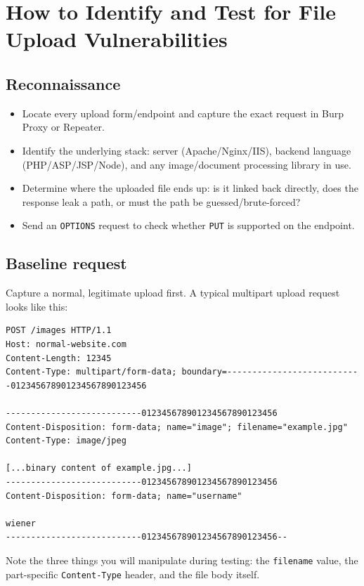 \documentclass[11pt]{article}
\begin{document}
\section{How to Identify and Test for File Upload Vulnerabilities}

\subsection{Reconnaissance}
\begin{itemize}[leftmargin=1.4em]
    \item Locate every upload form/endpoint and capture the exact request in Burp Proxy or Repeater.
    \item Identify the underlying stack: server (Apache/Nginx/IIS), backend language (PHP/ASP/JSP/Node), and any image/document processing library in use.
    \item Determine where the uploaded file ends up: is it linked back directly, does the response leak a path, or must the path be guessed/brute-forced?
    \item Send an \texttt{OPTIONS} request to check whether \texttt{PUT} is supported on the endpoint.
\end{itemize}

\subsection{Baseline request}
Capture a normal, legitimate upload first. A typical multipart upload request looks like this:

\begin{lstlisting}[language=http]
POST /images HTTP/1.1
Host: normal-website.com
Content-Length: 12345
Content-Type: multipart/form-data; boundary=---------------------------012345678901234567890123456

---------------------------012345678901234567890123456
Content-Disposition: form-data; name="image"; filename="example.jpg"
Content-Type: image/jpeg

[...binary content of example.jpg...]
---------------------------012345678901234567890123456
Content-Disposition: form-data; name="username"

wiener
---------------------------012345678901234567890123456--
\end{lstlisting}

Note the three things you will manipulate during testing: the \texttt{filename} value, the part-specific \texttt{Content-Type} header, and the file body itself.
\end{document}

